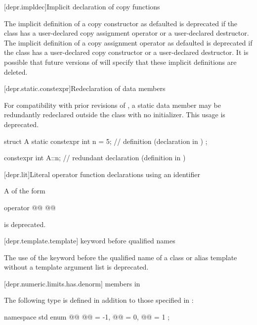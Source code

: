 [depr.impldec]{Implicit declaration of copy functions}

\pnum
The implicit definition of a copy constructor
as defaulted is deprecated if the class has
a user-declared copy assignment operator or
a user-declared destructor.
The implicit definition of a copy assignment operator
as defaulted is deprecated if the class has
a user-declared copy constructor or
a user-declared destructor.
It is possible that future versions of \Cpp{} will specify
that these implicit definitions are deleted.

[depr.static.constexpr]{Redeclaration of  data members}

\pnum
For compatibility with prior revisions of \Cpp{}, a 
static data member may be redundantly redeclared outside the class with no
initializer.
This usage is deprecated.
\begin{example}
\begin{codeblock}
struct A {
  static constexpr int n = 5;   // definition (declaration in \CppXIV{})
};

constexpr int A::n;             // redundant declaration (definition in \CppXIV{})
\end{codeblock}
\end{example}

[depr.lit]{Literal operator function declarations using an identifier}

\pnum
A  of the form
\begin{codeblock}
operator @@ @@
\end{codeblock}
is deprecated.

[depr.template.template]{ keyword before qualified names}

\pnum
The use of the keyword 
before the qualified name of a class or alias template
without a template argument list is deprecated.

[depr.numeric.limits.has.denorm]{ members in }

\pnum
The following type is defined
in addition to those specified in :
\begin{codeblock}
namespace std {
  enum @@ {
    @@ = -1,
    @@ = 0,
    @@ = 1
  };
}
\end{codeblock}

